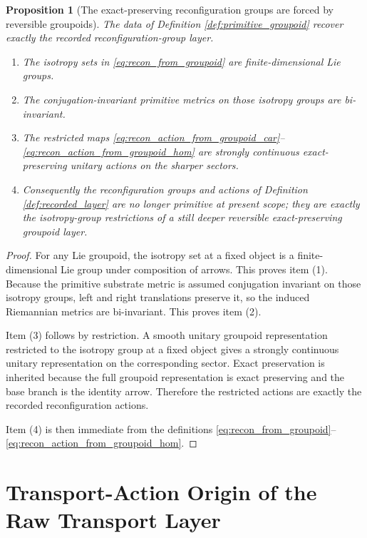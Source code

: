 \documentclass[11pt]{article}
\newtheorem{proposition}{Proposition}
\begin{document}
\begin{proposition}[The exact-preserving reconfiguration groups are forced by reversible groupoids]
\label{prop:reconfiguration_from_groupoid}
The data of Definition \ref{def:primitive_groupoid} recover exactly the recorded reconfiguration-group layer.
\begin{enumerate}
    \item The isotropy sets in \eqref{eq:recon_from_groupoid} are finite-dimensional Lie groups.
    \item The conjugation-invariant primitive metrics on those isotropy groups are bi-invariant.
    \item The restricted maps \eqref{eq:recon_action_from_groupoid_car}--\eqref{eq:recon_action_from_groupoid_hom} are strongly continuous exact-preserving unitary actions on the sharper sectors.
    \item Consequently the reconfiguration groups and actions of Definition \ref{def:recorded_layer} are no longer primitive at present scope; they are exactly the isotropy-group restrictions of a still deeper reversible exact-preserving groupoid layer.
\end{enumerate}
\end{proposition}

\begin{proof}
For any Lie groupoid, the isotropy set at a fixed object is a finite-dimensional Lie group under composition of arrows. This proves item (1). Because the primitive substrate metric is assumed conjugation invariant on those isotropy groups, left and right translations preserve it, so the induced Riemannian metrics are bi-invariant. This proves item (2).

Item (3) follows by restriction. A smooth unitary groupoid representation restricted to the isotropy group at a fixed object gives a strongly continuous unitary representation on the corresponding sector. Exact preservation is inherited because the full groupoid representation is exact preserving and the base branch is the identity arrow. Therefore the restricted actions are exactly the recorded reconfiguration actions.

Item (4) is then immediate from the definitions \eqref{eq:recon_from_groupoid}--\eqref{eq:recon_action_from_groupoid_hom}.
\end{proof}

\section{Transport-Action Origin of the Raw Transport Layer}
\end{document}
